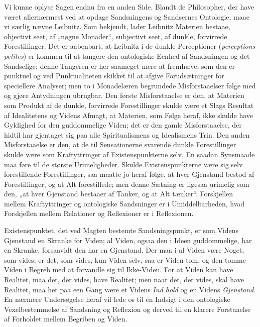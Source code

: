 \documentclass[11pt]{book}
\newcommand{\opage}[1]{\marginnote{\footnotesize\textit{[#1]}}}
\begin{document}
Vi kunne oplyse Sagen endnu fra en anden Side. Blandt de Philosopher,
der have været allernærmest ved at
\opage{259} \setcounter{footnote}{0}%
opdage Sandsningens og Sandsernes Ontologie, maae vi særlig nævne
Leibnitz. Som bekjendt, lader Leibnitz Materien bestaae, objectivt
seet, af „nøgne Monader“, subjectivt seet, af dunkle, forvirrede
Forestillinger. Det er aabenbart, at Leibnitz i de dunkle
Perceptioner (\textit{perceptions petites}) er kommen til at tangere
den ontologiske Eenhed af Sandsningen og det Sandselige; denne
Tangeren er her saameget mere at fremhæve, som den er punktuel og
ved Punktualiteten skikket til at afgive Forudsætninger for
speciellere Analyser; men to i Monadelæren begrundede
Misforstaaelser følge med og gjøre Antydningen ubrugbar. Den
første Misforstaaelse er den, at Materien som Produkt af de dunkle,
forvirrede Forestillinger skulde være et Slags Resultat af
Idealitetens og Videns Afmagt, at Materien, som Følge heraf, ikke
skulde have Gyldighed for den guddommelige Viden; det er den gamle
Misforstaaelse, der hidtil har gjentaget sig paa alle Spiritualismens
og Idealismens Trin. Den anden Misforstaaelse er den, at de til
Sensationerne svarende dunkle Forestillinger skulde være som
Kraftyttringer af Existenspunkterne selv. En saadan Synsmaade maa
føre til de største Urimeligheder. Skulde Existenspunkterne være
sig selv forestillende Forestillinger, saa maatte jo heraf følge, at
hver Gjenstand bestod af Forestillinger, og at Alt forestillede; men
denne Sætning er ligesaa urimelig som den, „at hver Gjenstand
bestaaer af Tanker, og at Alt tænker“. Forskjellen mellem
Kraftyttringer og ontologiske Sandsninger er i Umiddelbarheden, hvad
Forskjellen mellem Relationer og Reflexioner er i Reflexionen.

Existenspunktet, det ved Magten bestemte Sandsningspunkt, er som
Videns Gjenstand en Skranke for Viden; al Viden, ogsaa den i Ideen
guddommelige, har en Skranke, forsaavidt den har en Gjenstand. Der
maa i al Viden være
Noget, som vides; er det, som vides, kun Viden selv, saa er Viden
tom, og den tomme Viden i Begreb med at forvandle
\opage{260} \setcounter{footnote}{0}%
sig til Ikke-Viden. For at Viden kan have Realitet, maa det, der
vides, have Realitet; men naar det, der vides, skal
have Realitet, maa her paa een Gang være et Videns \emph{Ind\-%
hold} og en Videns \emph{Gjenstand}. En nærmere Undersøgelse heraf
vil lede os til en Indsigt i den ontologiske Vexelbestemmelse af
Sandsning og Reflexion og derved til en klarere Forstaaelse af
Forholdet mellem Begriben og Viden.
\end{document}
